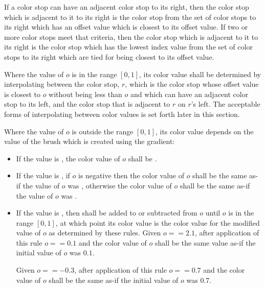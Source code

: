 \begin{enumeratea}
\item If a color stop can have an adjacent color stop to its right, then the color stop which is adjacent to it to its right is the color stop from the set of color stops to its right which has an offset value which is closest to its offset value. If two or more color stops meet that criteria, then the color stop which is adjacent to it to its right is the color stop which has the lowest index value from the set of color stops to its right which are tied for being closest to its offset value.

\item Where the value of $o$ is in the range $[0,1]$, its color value shall be determined by interpolating between the color stop, $r$, which is the color stop whose offset value is closest to $o$ without being less than $o$ and which can have an adjacent color stop to its left, and the color stop that is adjacent to $r$ on $r$'s left. The acceptable forms of interpolating between color values is set forth later in this section.

\item Where the value of $o$ is outside the range $[0,1]$, its color value depends on the  value of the brush which is created using the gradient:
	\begin{itemize}
	\item If the  value is , the color value of $o$ shall be .
	
	\item If the  value is , if $o$ is negative then the color value of $o$ shall be the same as-if the value of $o$ was , otherwise the color value of $o$ shall be the same as-if the value of $o$ was .
	
	\item If the  value is , then  shall be added to or subtracted from $o$ until $o$ is in the range $[0,1]$, at which point its color value is the color value for the modified value of $o$ as determined by these rules.
	\enterexample
	Given $o == 2.1$, after application of this rule $o == 0.1$ and the color value of $o$ shall be the same value as-if the initial value of $o$ was $0.1$.
	
	Given $o == -0.3$, after application of this rule $o == 0.7$ and the color value of $o$ shall be the same as-if the initial value of $o$ was $0.7$.
	\exitexample
	

\end{itemize}
\end{enumeratea}
